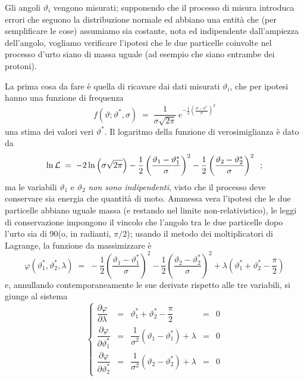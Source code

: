 Gli angoli $\vartheta_i$ vengono misurati; supponendo che il
processo di misura introduca errori che seguono la
distribuzione normale ed abbiano una entit\`a che (per
semplificare le cose) assumiamo sia costante, nota ed
indipendente dall'ampiezza dell'angolo, vogliamo verificare
l'ipotesi che le due particelle coinvolte nel processo
d'urto siano di massa uguale (ad esempio che siano entrambe
dei protoni).

La prima cosa da fare \`e quella di ricavare dai dati
misurati $\vartheta_i$, che per ipotesi hanno una funzione
di frequenza
\begin{equation*}
  f(\vartheta; \vartheta^*, \sigma) \; = \; \frac{1}{\sigma
    \sqrt{2 \pi}} \, e^{- \frac{1}{2} \left( \frac{\vartheta
        - \vartheta^*}{\sigma} \right)^2}
\end{equation*}
una stima dei valori veri $\vartheta^*$.  Il logaritmo della
funzione di verosimiglianza \`e dato da
\begin{equation*}
  \ln \mathcal{L} \; = \; - 2 \ln \left( \sigma \sqrt{2 \pi}
    \right) - \frac{1}{2} \left( \frac{\vartheta_1 -
        \vartheta_1^*}{\sigma} \right)^2  - \frac{1}{2}
    \left( \frac{\vartheta_2 - \vartheta_2^*}{\sigma}
    \right)^2 \;\; ;
\end{equation*}
ma le variabili $\vartheta_1$ e $\vartheta_2$ \emph{non sono
  indipendenti}, visto che il processo deve conservare sia
energia che quantit\`a di moto.  Ammessa vera l'ipotesi che
le due particelle abbiano uguale massa (e restando nel
limite non-relativistico), le leggi di conservazione
impongono il vincolo che l'angolo tra le due particelle dopo
l'urto sia di 90\gra (o, in radianti, $\pi / 2$); usando il
metodo dei moltiplicatori di Lagrange, la funzione da
massimizzare \`e
\begin{equation*}
  \varphi( \vartheta_1^*, \vartheta_2^*, \lambda) \; =
  \; - \frac{1}{2} \left( \frac{\vartheta_1 -
      \vartheta_1^*}{\sigma} \right)^2 - \frac{1}{2}
  \left( \frac{\vartheta_2 - \vartheta_2^*}{\sigma}
  \right)^2 + \lambda \left( \vartheta_1^* +
    \vartheta_2^* - \frac{\pi}{2} \right)
\end{equation*}
e, annullando contemporaneamente le sue derivate rispetto
alle tre variabili, si giunge al sistema
\begin{equation*}
  \left\{
    \begin{array}{cclcc}
      \dfrac{\partial \varphi}{\partial \lambda} & = &
      \vartheta_1^* + \vartheta_2^* - \dfrac{\pi}{2} & = &
      0 \\[2.5ex]
      \dfrac{\partial \varphi}{\partial \vartheta_1^*} & = &
      \dfrac{1}{\sigma^2} \left( \vartheta_1 - \vartheta_1^*
      \right) + \lambda & = & 0 \\[2.5ex]
      \dfrac{\partial \varphi}{\partial \vartheta_2^*} & = &
      \dfrac{1}{\sigma^2} \left( \vartheta_2 - \vartheta_2^*
      \right) + \lambda & = & 0
    \end{array}
  \right.
\end{equation*}
